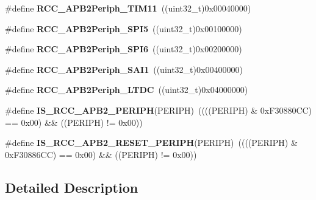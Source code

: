 \begin{DoxyCompactItemize}
\#define {\bfseries R\+C\+C\+\_\+\+A\+P\+B2\+Periph\+\_\+\+T\+I\+M11}~((uint32\+\_\+t)0x00040000)
\item 
\mbox{\label{group___r_c_c___a_p_b2___peripherals_ga4cfc10e584fe9d1fd4c8cda5c0e8b9a1}} 
\#define {\bfseries R\+C\+C\+\_\+\+A\+P\+B2\+Periph\+\_\+\+S\+P\+I5}~((uint32\+\_\+t)0x00100000)
\item 
\mbox{\label{group___r_c_c___a_p_b2___peripherals_gace0f03bd90517afe98859217187bb5b5}} 
\#define {\bfseries R\+C\+C\+\_\+\+A\+P\+B2\+Periph\+\_\+\+S\+P\+I6}~((uint32\+\_\+t)0x00200000)
\item 
\mbox{\label{group___r_c_c___a_p_b2___peripherals_ga80c1dce78807daa639ecaa3815cd6ba5}} 
\#define {\bfseries R\+C\+C\+\_\+\+A\+P\+B2\+Periph\+\_\+\+S\+A\+I1}~((uint32\+\_\+t)0x00400000)
\item 
\mbox{\label{group___r_c_c___a_p_b2___peripherals_gacbe8b85e0693d74f841775eef05e56b6}} 
\#define {\bfseries R\+C\+C\+\_\+\+A\+P\+B2\+Periph\+\_\+\+L\+T\+DC}~((uint32\+\_\+t)0x04000000)
\item 
\mbox{\label{group___r_c_c___a_p_b2___peripherals_ga89a2b95e60e90a51b26b53cc4c0e7b14}} 
\#define {\bfseries I\+S\+\_\+\+R\+C\+C\+\_\+\+A\+P\+B2\+\_\+\+P\+E\+R\+I\+PH}(P\+E\+R\+I\+PH)~((((P\+E\+R\+I\+PH) \& 0x\+F30880\+C\+C) == 0x00) \&\& ((\+P\+E\+R\+I\+P\+H) != 0x00))
\item 
\mbox{\label{group___r_c_c___a_p_b2___peripherals_ga91ecddb4dcb7a07da7178e7f9ba585c7}} 
\#define {\bfseries I\+S\+\_\+\+R\+C\+C\+\_\+\+A\+P\+B2\+\_\+\+R\+E\+S\+E\+T\+\_\+\+P\+E\+R\+I\+PH}(P\+E\+R\+I\+PH)~((((P\+E\+R\+I\+PH) \& 0x\+F30886\+C\+C) == 0x00) \&\& ((\+P\+E\+R\+I\+P\+H) != 0x00))
\end{DoxyCompactItemize}


\subsection{Detailed Description}
